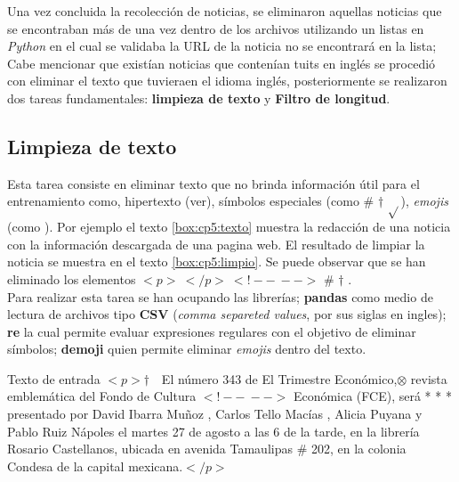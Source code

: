Una vez concluida la recolección de noticias, se eliminaron aquellas noticias que se encontraban más de una vez dentro de los archivos utilizando un listas en \textit{Python} en el cual se validaba la URL de la noticia no se encontrará en la lista; Cabe mencionar que existían noticias que contenían tuits en inglés se procedió con eliminar el texto que tuvieraen el idioma inglés, posteriormente se realizaron dos tareas fundamentales: \textbf{limpieza de texto} y \textbf{Filtro de longitud}. \\

\subsection{Limpieza de texto}

Esta tarea consiste en eliminar texto que no brinda información útil para el entrenamiento como, hipertexto (ver), símbolos especiales (como \# $\dagger$ $\sqrt{ }$), \textit{emojis} (como \dSmiley \dCooley \dNinja). Por ejemplo el texto \ref{box:cp5:texto} muestra la redacción de una noticia con la información descargada de una pagina web. El resultado de limpiar la noticia se muestra en el texto \ref{box:cp5:limpio}. Se puede observar que se han eliminado los elementos $<p>\ </p>\ <!--\ -->$ \# $\dagger$ \dSmiley \dCooley \dInnocey.\\

Para realizar esta tarea se han ocupando las librerías; \textbf{pandas} como medio de lectura de archivos tipo \textbf{CSV} (\textit{comma separeted values}, por sus siglas en ingles); \textbf{re} la cual permite evaluar expresiones regulares con el objetivo de eliminar símbolos; \textbf{demoji} quien permite eliminar \textit{emojis} dentro del texto.\\

\begin{mygraybox}[label={box:cp5:texto}]{Texto de entrada} 
$<p>\dagger$$\ \ \ $ El número 343 de El Trimestre Económico,$\otimes$ revista emblemática del Fondo de Cultura 
$<!--\ -->$
Económica (FCE), será * * * presentado por David Ibarra Muñoz \dSmiley , Carlos Tello Macías \dCooley , Alicia Puyana \dInnocey y Pablo Ruiz Nápoles el martes 27 de agosto a las 6 de la tarde, en la librería Rosario Castellanos, ubicada en avenida Tamaulipas \# 202, en la colonia Condesa de la capital mexicana.$</p>$
\end{mygraybox}

